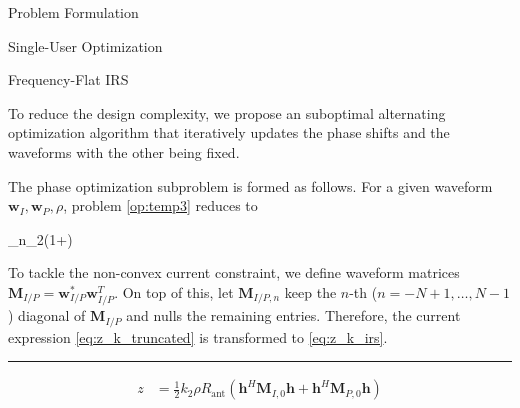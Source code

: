 \documentclass{IEEEtran}
\begin{document}
\begin{section}{Problem Formulation}
\begin{subsection}{Single-User Optimization}
\begin{subsubsection}{Frequency-Flat IRS}
\begin{maxi}
			\end{maxi}
			To reduce the design complexity, we propose an suboptimal alternating optimization algorithm that iteratively updates the phase shifts and the waveforms with the other being fixed.

			The phase optimization subproblem is formed as follows. For a given waveform $\boldsymbol{w}_I,\boldsymbol{w}_P,\rho$, problem \ref{op:temp3} reduces to
			\begin{maxi}
				{}{\sum_{n}{\log_2\left(1+\right)}}{\label{op:temp3}}{}
			\end{maxi}
			To tackle the non-convex current constraint, we define waveform matrices $\boldsymbol{M}_{I/P}=\boldsymbol{w}_{I/P}^*\boldsymbol{w}_{I/P}^T$. On top of this, let $\boldsymbol{M}_{I/P, n}$ keep the $n$-th ($n=-N+1,\dots,N-1$) diagonal of $\boldsymbol{M}_{I/P}$ and nulls the remaining entries. Therefore, the current expression \ref{eq:z_k_truncated} is transformed to \ref{eq:z_k_irs}.
			\begin{figure*}[b]
				\hrule
				\begin{equation}\label{eq:z_k_irs}
					\begin{split}
						z
						&=\frac{1}{2}{k_2}{\rho}{R_{\text{ant}}}(\boldsymbol{h}^H\boldsymbol{M}_{I,0}\boldsymbol{h}+\boldsymbol{h}^H\boldsymbol{M}_{P,0}\boldsymbol{h})\\

\end{split}
\end{equation}
\end{figure*}
\end{subsubsection}
\end{subsection}
\end{section}
\end{document}
